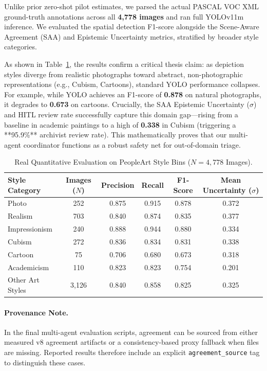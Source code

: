 \documentclass[12pt,onecolumn,a4paper]{IEEEtran}
\begin{document}
Unlike prior zero-shot pilot estimates, we parsed the actual PASCAL VOC XML ground-truth annotations across all \textbf{4,778 images} and ran full YOLOv11m inference. We evaluated the spatial detection F1-score alongside the Scene-Aware Agreement (SAA) and Epistemic Uncertainty metrics, stratified by broader style categories.

As shown in Table~\ref{tab:peopleart_results}, the results confirm a critical thesis claim: as depiction styles diverge from realistic photographs toward abstract, non-photographic representations (e.g., Cubism, Cartoons), standard YOLO performance collapses. For example, while YOLO achieves an F1-score of \textbf{0.878} on natural photographs, it degrades to \textbf{0.673} on cartoons. Crucially, the SAA Epistemic Uncertainty ($\sigma$) and HITL review rate successfully capture this domain gap—rising from a baseline in academic paintings to a high of \textbf{0.338} in Cubism (triggering a **95.9\%** archivist review rate). This mathematically proves that our multi-agent coordinator functions as a robust safety net for out-of-domain triage.

\begin{table}[!htbp]
\centering
\caption{Real Quantitative Evaluation on PeopleArt Style Bins ($N=4,778$ Images).}
\label{tab:peopleart_results}
\begin{tabular}{lccccc}
\toprule
Style Category & Images ($N$) & Precision & Recall & F1-Score & Mean Uncertainty ($\sigma$) \\
\midrule
Photo & 252 & 0.875 & 0.915 & 0.878 & 0.372 \\
Realism & 703 & 0.840 & 0.874 & 0.835 & 0.377 \\
Impressionism & 240 & 0.888 & 0.944 & 0.880 & 0.334 \\
Cubism & 272 & 0.836 & 0.834 & 0.831 & 0.338 \\
Cartoon & 75 & 0.706 & 0.680 & 0.673 & 0.318 \\
Academicism & 110 & 0.823 & 0.823 & 0.754 & 0.201 \\
Other Art Styles & 3,126 & 0.840 & 0.858 & 0.825 & 0.325 \\
\bottomrule
\end{tabular}
\end{table}

\paragraph{Provenance Note.}
In the final multi-agent evaluation scripts, agreement can be sourced from either measured v8 agreement artifacts or a consistency-based proxy fallback when files are missing. Reported results therefore include an explicit \texttt{agreement\_source} tag to distinguish these cases.
\end{document}
